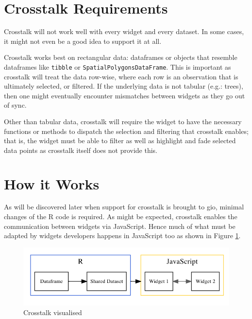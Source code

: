 \documentclass[10pt,]{krantz}
\begin{document}
\hypertarget{linking-widgets-req}{%
\section{Crosstalk Requirements}\label{linking-widgets-req}}

Crosstalk will not work well with every widget and every dataset. In some cases, it might not even be a good idea to support it at all.

Crosstalk works best on rectangular data: dataframes or objects that resemble dataframes like \texttt{tibble} or \texttt{SpatialPolygonsDataFrame}. This is important as crosstalk will treat the data row-wise, where each row is an observation that is ultimately selected, or filtered. If the underlying data is not tabular (e.g.: trees), then one might eventually encounter mismatches between widgets as they go out of sync.

Other than tabular data, crosstalk will require the widget to have the necessary functions or methods to dispatch the selection and filtering that crosstalk enables; that is, the widget must be able to filter as well as highlight and fade selected data points as crosstalk itself does not provide this.

\hypertarget{linking-widgets-inner-workings}{%
\section{How it Works}\label{linking-widgets-inner-workings}}

As will be discovered later when support for crosstalk is brought to gio, minimal changes of the R code is required. As might be expected, crosstalk enables the communication between widgets via JavaScript. Hence much of what must be adapted by widgets developers happens in JavaScript too as shown in Figure \ref{fig:crosstalk-diagram}.

\begin{figure}[H]

{\centering \includegraphics[width=1\linewidth]{images/03-crosstalk-viz} 

}

\caption{Crosstalk visualised}\label{fig:crosstalk-diagram}
\end{figure}
\end{document}
